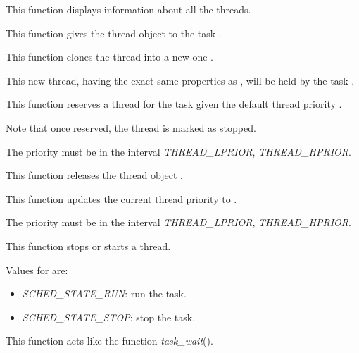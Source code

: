 \begin{itemize}
	 {
	   This function displays information about all the threads.
	 }

	 {
	   This function gives the thread object  to the
	   task .
	 }

	 {
	   This function clones the thread  into a new one
	   .

	   This new thread, having the exact same properties as ,
	   will be held by the task .
	 }

	 {
	   This function reserves a thread for the task 
	   given the default thread priority .

	   Note that once reserved, the thread is marked as stopped.

	   The priority must be in the interval \emph{THREAD\_LPRIOR},
	   \emph{THREAD\_HPRIOR}.
	 }

	 {
	   This function releases the thread object .
	 }

	 {
	   This function updates the current thread priority
	   to .

	   The priority must be in the interval \emph{THREAD\_LPRIOR},
	   \emph{THREAD\_HPRIOR}.
	 }

	 {
	   This function stops or starts a thread.

	   Values for  are:

	   \begin{itemize}
	     \item
	       \emph{SCHED\_STATE\_RUN}: run the task.
	     \item
	       \emph{SCHED\_STATE\_STOP}: stop the task.
	   \end{itemize}
	 }

	 {
	   This function acts like the function \emph{task\_wait}().

}
\end{itemize}
